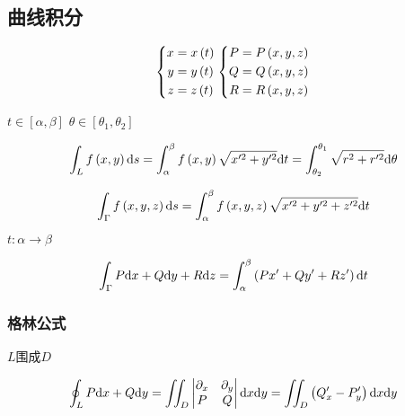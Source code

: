 \documentclass{article}
\begin{document}
\subsection{曲线积分}

\begin{definition}[]
    \[\left\{\begin{aligned}
            x & =x\left(t\right) \\
            y & =y\left(t\right) \\
            z & =z\left(t\right)
        \end{aligned}\right.
        \left\{\begin{aligned}
            P & =P\left(x,y,z\right) \\
            Q & =Q\left(x,y,z\right) \\
            R & =R\left(x,y,z\right)
        \end{aligned}\right.\]
\end{definition}

\begin{definition}[第一类]

    $t\in\left[\alpha,\beta\right]$
    $\theta\in\left[\theta_1,\theta_2\right]$

    \[\int_L f\left(x,y\right)\mathrm d s
        =\int^\beta_\alpha f\left(x,y\right)\sqrt{x^{\prime 2}+y^{\prime 2}}\mathrm d t
        =\int_{\theta_2}^{\theta_1}{\sqrt{r^2+r^{\prime2}}\mathrm d\theta}\]

    \[\int_\Gamma f\left(x,y,z\right)\mathrm d s
        =\int^\beta_\alpha f\left(x,y,z\right)\sqrt{x^{\prime 2}+y^{\prime 2}+z^{\prime 2}}\mathrm d t\]
\end{definition}

\begin{definition}

    $t:\alpha\to\beta$

    \[\int_\Gamma P\mathrm d x+Q\mathrm d y+R\mathrm d z=
        \int^\beta_\alpha\left(Px^\prime+Qy^\prime+Rz^\prime\right)\mathrm d t\]
\end{definition}

\subsubsection{格林公式}$L$围成$D$

\[\oint_LP\mathrm d x+Q\mathrm d y
    =\iint_D\begin{vmatrix}
        \partial_x & \partial_y \\
        P          & Q
    \end{vmatrix}\mathrm d x\mathrm d y
    =\iint_D\left(Q^\prime_x-P^\prime_y\right)\mathrm d x\mathrm d y\]
\end{document}
